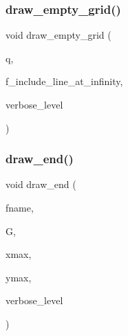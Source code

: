 \mbox{\label{conic_8_c_a0a991c7d8313e303d51bea14da7b490a}} 
\subsubsection{\texorpdfstring{draw\+\_\+empty\+\_\+grid()}{draw\_empty\_grid()}}
{\footnotesize\ttfamily void draw\+\_\+empty\+\_\+grid (\begin{DoxyParamCaption}\item[{\mbox{\hyperlink{galois_8h_a09fddde158a3a20bd2dcadb609de11dc}{I\+NT}}}]{q,  }\item[{\mbox{\hyperlink{galois_8h_a09fddde158a3a20bd2dcadb609de11dc}{I\+NT}}}]{f\+\_\+include\+\_\+line\+\_\+at\+\_\+infinity,  }\item[{\mbox{\hyperlink{galois_8h_a09fddde158a3a20bd2dcadb609de11dc}{I\+NT}}}]{verbose\+\_\+level }\end{DoxyParamCaption})}

\mbox{\label{conic_8_c_aa7a3dc8d6361a7ba3753a74bdc72b44a}} 
\subsubsection{\texorpdfstring{draw\+\_\+end()}{draw\_end()}}
{\footnotesize\ttfamily void draw\+\_\+end (\begin{DoxyParamCaption}\item[{char $\ast$}]{fname,  }\item[{\mbox{\hyperlink{classmp__graphics}{mp\+\_\+graphics}} $\ast$}]{G,  }\item[{\mbox{\hyperlink{galois_8h_a09fddde158a3a20bd2dcadb609de11dc}{I\+NT}}}]{xmax,  }\item[{\mbox{\hyperlink{galois_8h_a09fddde158a3a20bd2dcadb609de11dc}{I\+NT}}}]{ymax,  }\item[{\mbox{\hyperlink{galois_8h_a09fddde158a3a20bd2dcadb609de11dc}{I\+NT}}}]{verbose\+\_\+level }\end{DoxyParamCaption})}

\mbox{\label{conic_8_c_ad4469548f3a53a4be0974832573a8661}} 
